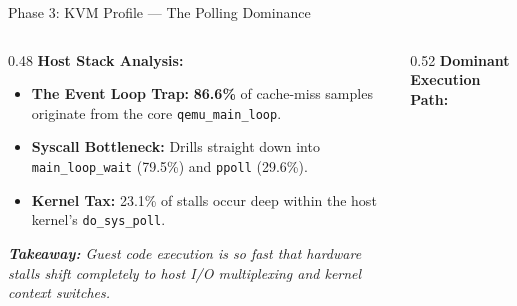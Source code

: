 \documentclass[aspectratio=169]{beamer} %
\begin{document}
  \begin{frame}{Phase 3: KVM Profile — The Polling Dominance}
      \begin{columns}[T]
          \begin{column}{0.48\textwidth}
              \textbf{Host Stack Analysis:}
              \begin{itemize}
                  \item \textbf{The Event Loop Trap:} \textbf{86.6\%} of cache-miss samples originate from the core \texttt{qemu\_main\_loop}.
                  \item \textbf{Syscall Bottleneck:} Drills straight down into \texttt{main\_loop\_wait} (79.5\%) and \texttt{ppoll} (29.6\%).
                  \item \textbf{Kernel Tax:} 23.1\% of stalls occur deep within the host kernel's \texttt{do\_sys\_poll}.
              \end{itemize}
              \vspace{0.4cm}
              \footnotesize \textit{\textbf{Takeaway:} Guest code execution is so fast that hardware stalls shift completely to host I/O multiplexing and kernel context switches.}
          \end{column}

          \begin{column}{0.52\textwidth}
              \textbf{Dominant Execution Path:}
              \vspace{0.3cm}
              \begin{center}
              \end{center}
          \end{column}
      \end{columns}
  \end{frame}
\end{document}

